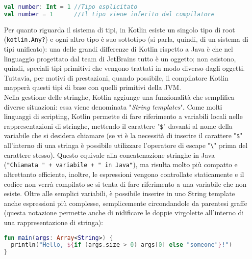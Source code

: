 \begin{lstlisting}[caption={Inferenza di tipo}, captionpos=b, label={lst:exampleInferenzaDiTipo}, language=Kotlin]
val number: Int = 1 //Tipo esplicitato
val number = 1      //Il tipo viene inferito dal compilatore
\end{lstlisting}

Per quanto riguarda il sistema di tipi, in Kotlin esiste un singolo tipo di root (\texttt{kotlin.Any?}) e ogni altro tipo è suo sottotipo (si parla, quindi, di un sistema di tipi unificato): una delle grandi differenze di Kotlin rispetto a Java è che nel linguaggio progettato dal team di JetBrains tutto è un oggetto; non esistono, quindi, speciali tipi primitivi che vengono trattati in modo diverso dagli oggetti. Tuttavia, per motivi di prestazioni, quando possibile, il compilatore Kotlin mapperà questi tipi di base con quelli primitivi della JVM.\\

Nella gestione delle stringhe, Kotlin aggiunge una funzionalità che semplifica diverse situazioni: essa viene denominata "{\em String templates}". Come molti linguaggi di scripting, Kotlin permette di fare riferimento a variabili locali nelle rappresentazioni di stringhe, mettendo il carattere "\texttt{\$}" davanti al nome della variabile che si desidera chiamare (se vi è la necessità di inserire il carattere "\texttt{\$}" all’interno di una stringa è possibile utilizzare l’operatore di escape "\texttt{\textbackslash}" prima del carattere stesso). Questo equivale alla concatenazione stringhe in Java (\texttt{"Chiamata " + variabile + " in Java"}), ma risulta molto più compatto e altrettanto efficiente, inoltre, le espressioni vengono controllate staticamente e il codice non verrà compilato se si tenta di fare riferimento a una variabile che non esiste. Oltre alle semplici variabili, è possibile inserire in uno String template anche espressioni più complesse, semplicemente circondandole da parentesi graffe (questa notazione permette anche di nidificare le doppie virgolette all'interno di una rappresentazione di stringa):\\

\begin{lstlisting}[caption={String Template}, captionpos=b, label={lst:exampleStringTemplate}, language=Kotlin]
fun main(args: Array<String>) {
  println("Hello, ${if (args.size > 0) args[0] else "someone"}!")
}
\end{lstlisting}

